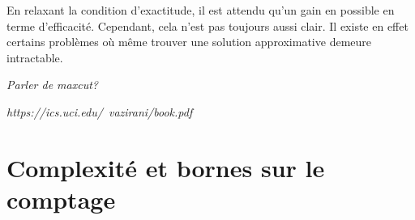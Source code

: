 En relaxant la condition d'exactitude, il est attendu qu'un gain en possible en terme d'efficacité. Cependant, cela n'est pas toujours aussi clair. Il existe en effet certains problèmes où même trouver une solution approximative demeure intractable.


\textcolor{mydarkred}{\textit{Parler de maxcut?}}

\textcolor{mydarkred}{\textit{https://ics.uci.edu/~vazirani/book.pdf}}


\section{Complexité et bornes sur le comptage}

